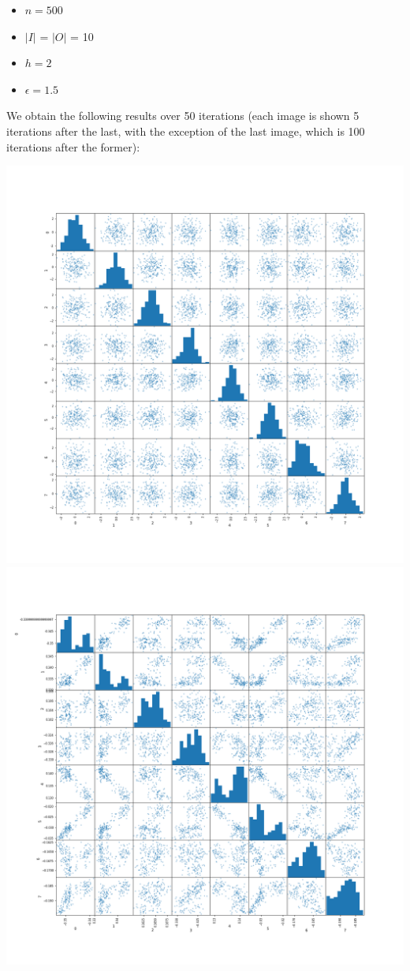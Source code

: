 \documentclass{article}
\begin{document}
\begin{itemize}
    \item $n = 500$
    \item $|I|$ = $|O|$ = 10
    \item $h = 2$
    \item $\epsilon = 1.5$ 
\end{itemize}

We obtain the following results over 50 iterations (each image is shown 5 iterations after the last, with the exception of the last image, which is 100 iterations after the former):

\begin{center}

\includegraphics[width=\linewidth]{200_10_0_8_0.png}
\includegraphics[width=\linewidth]{200_10_0_8_10.png}

\end{center}
\end{document}
